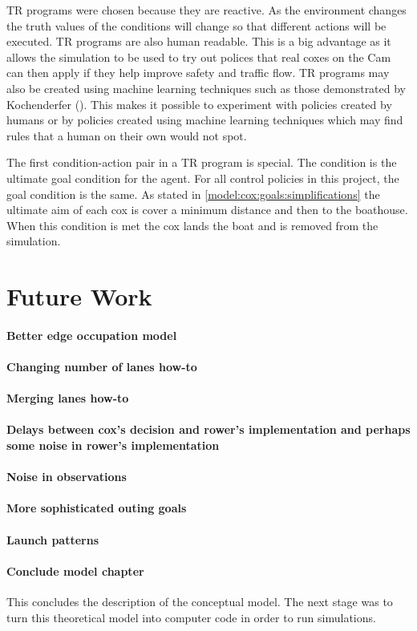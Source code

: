       TR programs were chosen because they are reactive. As the environment changes the truth values of the conditions will change so that different actions will be executed. TR programs are also human readable. This is a big advantage as it allows the simulation to be used to try out polices that real coxes on the Cam can then apply if they help improve safety and traffic flow. TR programs may also be created using machine learning techniques such as those demonstrated by Kochenderfer (\cite{Kochenderfer2003}). This makes it possible to experiment with policies created by humans or by policies created using machine learning techniques which may find rules that a human on their own would not spot.
      
      The first condition-action pair in a TR program is special. The condition is the ultimate goal condition for the agent. For all control policies in this project, the goal condition is the same. As stated in \ref{model:cox:goals:simplifications} the ultimate aim of each cox is cover a minimum distance and then to the boathouse. When this condition is met the cox lands the boat and is removed from the simulation.

\section{Future Work}

\paragraph{Better edge occupation model}
\paragraph{Changing number of lanes how-to}
\paragraph{Merging lanes how-to}

\paragraph{Delays between cox's decision and rower's implementation and perhaps some noise in rower's implementation}

\paragraph{Noise in observations}

\paragraph{More sophisticated outing goals}

\paragraph{Launch patterns}

\paragraph{Conclude model chapter}
This concludes the description of the conceptual model. The next stage was to turn this theoretical model into computer code in order to run simulations.
